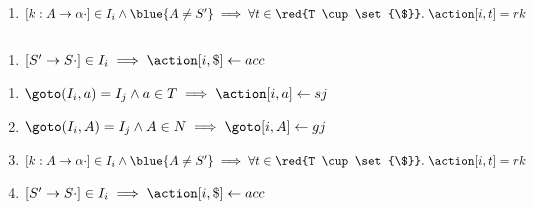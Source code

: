 \begin{frame}{}
  \begin{center}
    \begin{columns}
        
    \end{columns}

    \vspace{0.20cm}
    \begin{enumerate}[(3)]
      \centering
      \item $[k: A \to \alpha \cdot] \in I_{i} \land \blue{A \neq S'} \implies
        \forall t \in \red{T \cup \set{\$}}.\; \action[i, t] = rk$
    \end{enumerate}
  \end{center}
\end{frame}

\begin{frame}{}
  \begin{center}
    \begin{columns}
        
    \end{columns}

    \vspace{0.20cm}
    \begin{enumerate}[(4)]
      \centering
      \item $[S' \to S \cdot] \in I_{i} \implies \action[i, \$] \gets acc$
    \end{enumerate}
  \end{center}
\end{frame}

\begin{frame}{}
  \begin{center}

    \vspace{0.60cm}
    \begin{enumerate}[(1)]
      \setlength{\itemsep}{25pt}
      \item $\goto(I_{i}, a) = I_{j} \land a \in T \implies \action[i, a] \gets sj$
      \item $\goto(I_{i}, A) = I_{j} \land A \in N \implies \goto[i, A] \gets gj$
      \item $[k: A \to \alpha \cdot] \in I_{i} \land \blue{A \neq S'} \implies
        \forall t \in \red{T \cup \set{\$}}.\; \action[i, t] = rk$
      \item $[S' \to S \cdot] \in I_{i} \implies \action[i, \$] \gets acc$
    \end{enumerate}
  \end{center}
\end{frame}

